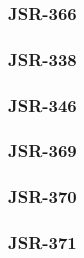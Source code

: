 		\subsubsection{JSR-366}
		\subsubsection{JSR-338}
		\subsubsection{JSR-346}
		\subsubsection{JSR-369}
		\subsubsection{JSR-370}
		\subsubsection{JSR-371}

		
		
		
		
